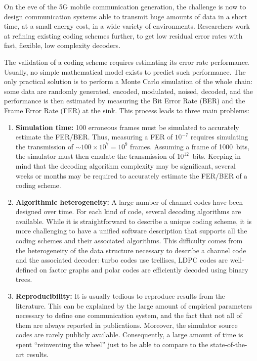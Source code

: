 On the eve of the 5G mobile communication generation, the challenge is now to
design communication systems able to transmit huge amounts of data in a short
time, at a small energy cost, in a wide variety of environments. Researchers
work at refining existing coding schemes further, to get low residual error
rates with fast, flexible, low complexity decoders.

The validation of a coding scheme requires estimating its error rate
performance. Usually, no simple mathematical model exists to predict such
performance. The only practical solution is to perform a Monte Carlo simulation
of the whole chain: some data are randomly generated, encoded, modulated,
noised, decoded, and the performance is then estimated by measuring the Bit
Error Rate (BER) and the Frame Error Rate (FER) at the sink. This process leads
to three main problems:

\begin{enumerate}
  \item \textbf{Simulation time:}
    100 erroneous frames must be simulated to accurately estimate the FER/BER.
    Thus, measuring a FER of $10^{-7}$ requires simulating the transmission of
    $\sim100\times 10^7=10^9$ frames. Assuming a frame of 1000~bits, the
    simulator must then emulate the transmission of $10^{12}$~bits. Keeping in
    mind that the decoding algorithm complexity may be significant, several
    weeks or months may be required to accurately estimate the FER/BER of a
    coding scheme.

  \item \textbf{Algorithmic heterogeneity:} A large number of channel codes have
    been designed over time. For each kind of code, several decoding algorithms
    are available. While it is straightforward to describe a unique coding
    scheme, it is more challenging to have a unified software description that
    supports all the coding schemes and their associated algorithms. This
    difficulty comes from the heterogeneity of the data structure necessary to
    describe a channel code and the associated decoder: turbo codes use
    trellises, LDPC codes are well-defined on factor graphs and polar codes are
    efficiently decoded using binary trees.

  \item \textbf{Reproducibility:} It is usually tedious to reproduce results
    from the literature. This can be explained by the large amount of empirical
    parameters necessary to define one communication system, and the fact that
    not all of them are always reported in publications. Moreover, the simulator
    source codes are rarely publicly available. Consequently, a large amount of
    time is spent ``reinventing the wheel'' just to be able to compare to the
    state-of-the-art results.
\end{enumerate}

